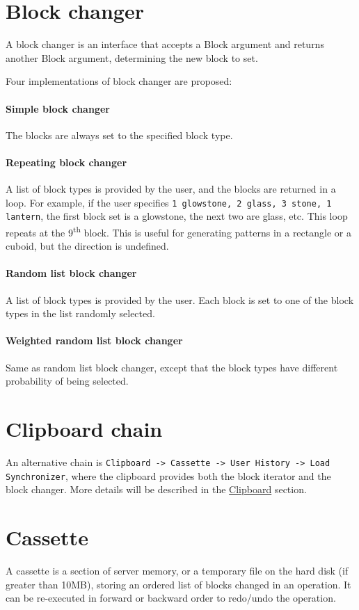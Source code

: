 \documentclass{report}
\def \sup #1{\textsuperscript{#1}}
\begin{document}
			\section{Block changer}
				A block changer is an interface that accepts a Block argument and returns another Block argument,
				determining the new block to set.

				Four implementations of block changer are proposed:
				\paragraph{Simple block changer} The blocks are always set to the specified block type.
				\paragraph{Repeating block changer} A list of block types is provided by the user, and the blocks are
				returned in a loop. For example, if the user specifies \texttt{1 glowstone, 2 glass, 3 stone, 1 lantern},
				the first block set is a glowstone, the next two are glass, etc. This loop repeats at the 9\sup{th}
				block. This is useful for generating patterns in a rectangle or a cuboid, but the direction is undefined.
				\paragraph{Random list block changer} A list of block types is provided by the user. Each block is set
				to one of the block types in the list randomly selected.
				\paragraph{Weighted random list block changer} Same as random list block changer, except that the block
				types have different probability of being selected.

			\section{Clipboard chain}
				An alternative chain is \texttt{Clipboard -> Cassette -> User History -> Load Synchronizer}, where the
				clipboard provides both the block iterator and the block changer. More details will be described in the
				\hyperref[sec:clipboard]{Clipboard} section.

			\section{Cassette}
				A cassette is a section of server memory, or a temporary file on the hard disk (if greater than 10MB),
				storing an ordered list of blocks changed in an operation. It can be re-executed in forward or backward
				order to redo/undo the operation.
\end{document}
